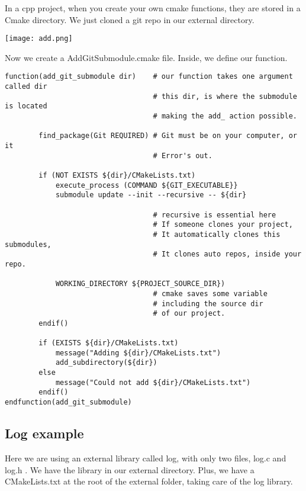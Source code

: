In a cpp project, when you create your own cmake functions, they are stored in a Cmake directory. We just cloned a 
git repo in our external directory.

\begin{center}
    \texttt{[image: add.png]}
\end{center}

Now we create a AddGitSubmodule.cmake file. Inside, we define our function.

\begin{verbatim}
function(add_git_submodule dir)    # our function takes one argument called dir
                                   # this dir, is where the submodule is located
                                   # making the add_ action possible.

        find_package(Git REQUIRED) # Git must be on your computer, or it
                                   # Error's out.

        if (NOT EXISTS ${dir}/CMakeLists.txt)
            execute_process (COMMAND ${GIT_EXECUTABLE}}
            submodule update --init --recursive -- ${dir}

                                   # recursive is essential here
                                   # If someone clones your project, 
                                   # It automatically clones this submodules,
                                   # It clones auto repos, inside your repo.
                                                            
            WORKING_DIRECTORY ${PROJECT_SOURCE_DIR}) 
                                   # cmake saves some variable
                                   # including the source dir
                                   # of our project.
        endif()
        
        if (EXISTS ${dir}/CMakeLists.txt)
            message("Adding ${dir}/CMakeLists.txt")
            add_subdirectory(${dir})
        else
            message("Could not add ${dir}/CMakeLists.txt")
        endif()
endfunction(add_git_submodule)
\end{verbatim}

\subsection{Log example}

Here we are using an external library called log, with only two files, log.c and log.h . We have the library in our 
external directory. Plus, we have a CMakeLists.txt at the root of the external folder, taking care of the log library. 

